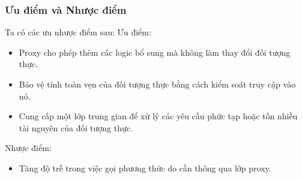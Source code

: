 \subsubsection{Ưu điểm và Nhược điểm}
Ta có các ưu nhược điểm sau:
Ưu điểm:
\begin{itemize}
    \item Proxy cho phép thêm các logic bổ sung mà không làm thay đổi đối tượng thực.
    \item Bảo vệ tính toàn vẹn của đối tượng thực bằng cách kiểm soát truy cập vào nó.
    \item Cung cấp một lớp trung gian để xử lý các yêu cầu phức tạp hoặc tốn nhiều tài nguyên của đối tượng thực.
\end{itemize}
Nhược điểm:
\begin{itemize}
    \item Tăng độ trễ trong việc gọi phương thức do cần thông qua lớp proxy.
\end{itemize}
